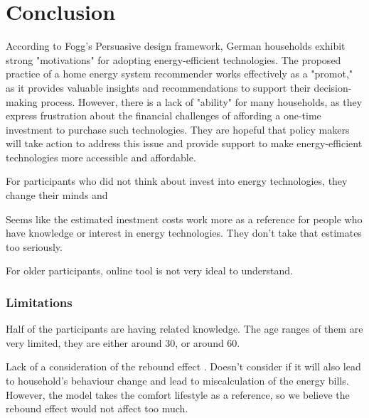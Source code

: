 \chapter{Conclusion}

According to Fogg's Persuasive design framework, 
German households exhibit strong "motivations" for adopting energy-efficient technologies. 
The proposed practice of a home energy system recommender works effectively as a "promot," as it provides valuable insights and recommendations to support their decision-making process. 
However, there is a lack of "ability" for many households, 
as they express frustration about the financial challenges of affording a one-time investment to purchase such technologies. 
They are hopeful that policy makers will take action to address this issue and provide support to make energy-efficient technologies more accessible and affordable.

For participants who did not think about invest into energy technologies,
they change their minds and 

Seems like the estimated inestment costs work more as a reference for people who have knowledge or interest in energy technologies. 
They don't take that estimates too seriously. 

For older participants, online tool is not very ideal to understand. 


\subsection{Limitations}

Half of the participants are having related knowledge. 
The age ranges of them are very limited, they are either around 30, or around 60. 

Lack of a consideration of the rebound effect \cite{Herring2007}. 
Doesn't consider if it will also lead to household's behaviour change and lead to miscalculation of the energy bills. 
However, the model takes the comfort lifestyle as a reference, so we believe the rebound effect would not affect too much. 
